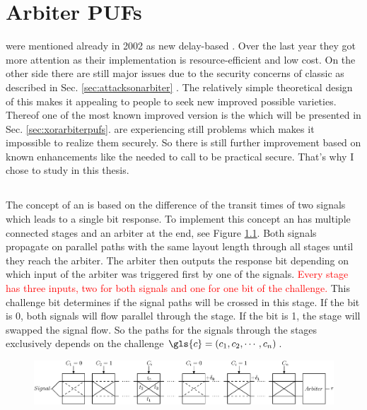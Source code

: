 \chapter{Arbiter \acsp{PUF}}
\label{cap:arbiter}

\apufs were mentioned already in 2002 as new delay-based \puf \cite{Gassend2002SiliconFunctions}.
Over the last year they got more attention as their implementation is resource-efficient and low cost. \cite{Becker2014ActiveDesigns,Suh2007PhysicalGeneration}
On the other side there are still major issues due to the security concerns of classic \apufs as described in Sec. \ref{sec:attacksonarbiter} \cite{Ganji2016PACPUFs} \cite{Ruhrmair2014PUFOverview}.
The relatively simple theoretical design of this \puf makes it appealing to people to seek new improved possible varieties.
Thereof one of the most known improved version is the \xpuf which will be presented in Sec. \ref{sec:xorarbiterpufs}.
\xpufs are experiencing still problems which makes it impossible to realize them securely.
So there is still further improvement based on known enhancements like the \xpuf needed to call \apufs to be practical secure.
That's why I chose to study \apufs in this thesis.

\section{\apufs}
\label{sec:arbiter}

The concept of an \apufs is based on the difference of the transit times of two signals which leads to a single bit response. 
To implement this concept an \apuf has multiple connected stages and an arbiter at the end, see Figure \ref{fig:arbiter}.
Both signals propagate on parallel paths with the same layout length through all stages until they reach the arbiter.
The arbiter then outputs the response bit depending on which input of the arbiter was triggered first by one of the signals.
\textcolor{red}{Every stage has three inputs, two for both signals and one for one bit of the challenge.}
This challenge bit determines if the signal paths will be crossed in this stage. 
If the bit is 0, both signals will flow parallel through the stage.
If the bit is 1, the stage will swapped the signal flow.
So the paths for the signals through the stages exclusively depends on the challenge $\gls{c} = (c_1, c_2, \cdots, c_n)$.

\begin{figure}[ht]
\centering
\includegraphics[width=1.00\textwidth]{images/arbiter_puf.eps}
\caption{\apuf}
\label{fig:arbiter}
\end{figure}

